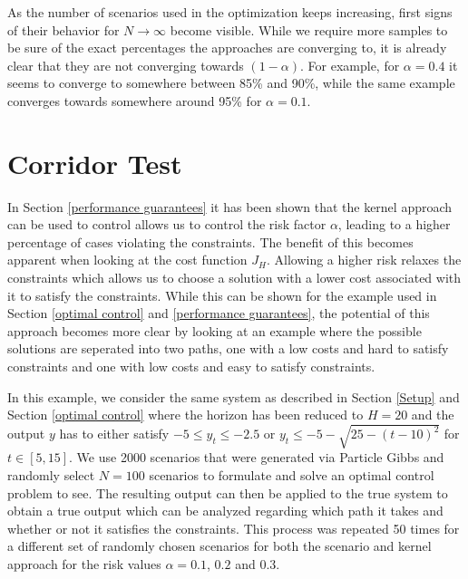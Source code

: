 As the number of scenarios used in the optimization keeps increasing, first signs of their behavior for $N \to \infty$ become visible. While we require more samples to be sure of the exact percentages the approaches are converging to, it is already clear that they are not converging towards $(1 - \alpha)$. For example, for $\alpha = 0.4$ it seems to converge to somewhere between 85\% and 90\%, while the same example converges towards somewhere around 95\% for $\alpha = 0.1$.
 
\section{Corridor Test} \label{corridor}

In Section \ref{performance guarantees} it has been shown that the kernel approach can be used to control allows us to control the risk factor $\alpha$, leading to a higher percentage of cases violating the constraints. The benefit of this becomes apparent when looking at the cost function $J_H$. Allowing a higher risk relaxes the constraints which allows us to choose a solution with a lower cost associated with it to satisfy the constraints. While this can be shown for the example used in Section \ref{optimal control} and \ref{performance guarantees}, the potential of this approach becomes more clear by looking at an example where the possible solutions are seperated into two paths, one with a low costs and hard to satisfy constraints and one with low costs and easy to satisfy constraints.

In this example, we consider the same system as described in Section \ref{Setup} and Section \ref{optimal control} where the horizon has been reduced to $H = 20$ and the output $y$ has to either satisfy $-5 \leq y_t \leq -2.5$ or $y_t \leq -5 - \sqrt{25- (t - 10)^2}$ for $t \in [5, 15]$. We use 2000 scenarios that were generated via Particle Gibbs and randomly select $N = 100$ scenarios to formulate and solve an optimal control problem to see. The resulting output can then be applied to the true system to obtain a true output which can be analyzed regarding which path it takes and whether or not it satisfies the constraints. This process was repeated 50 times for a different set of randomly chosen scenarios for both the scenario and kernel approach for the risk values $\alpha = 0.1$, $0.2$ and $0.3$.



